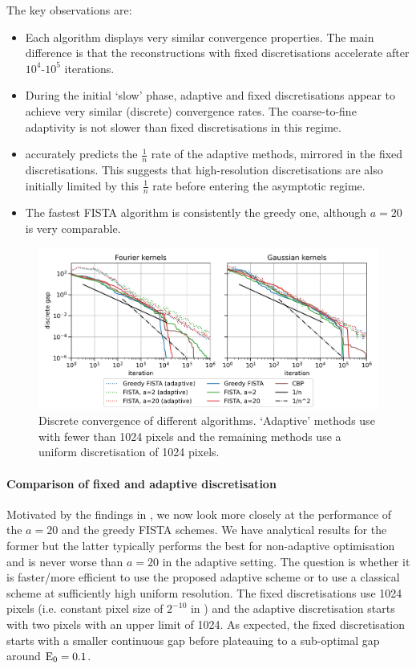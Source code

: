 \documentclass[10pt,a4paper,onecolumn]{article}
\numberwithin{equation}{section}
\newcommand{\op}[1]{\operatorname{#1}}\newcommand{\overtext}[2]{\stackrel{\text{#1}}{#2}}
\newcommand*{\Func}[1]{%
	\IfEqCase{#1}{%
		{0}{\op{E}}%
		{1}{\op{F}}%
		{2}{\op{G}}%
		{3}{\op{H}}%
	}[\op{F}#1]%
}
\begin{document}
The key observations are:
\begin{itemize}
	\item Each algorithm displays very similar convergence properties. The main difference is that the reconstructions with fixed discretisations accelerate after $10^4$-$10^5$ iterations.
	\item During the initial `slow' phase, adaptive and fixed discretisations appear to achieve very similar (discrete) convergence rates. The coarse-to-fine adaptivity is not slower than fixed discretisations in this regime.
	\item {} accurately predicts the $\frac1n$ rate of the adaptive methods, mirrored in the fixed discretisations. This suggests that high-resolution discretisations are also initially limited by this $\frac1n$ rate before entering the asymptotic regime.
	\item The fastest FISTA algorithm is consistently the greedy one, although $a=20$ is very comparable.
\end{itemize}

\begin{figure}[H]\centering
	\includegraphics[width=.84\textwidth]{lasso_convergence_short}
	\caption{Discrete convergence of different algorithms. `Adaptive' methods use  with fewer than 1024 pixels and the remaining methods use a uniform discretisation of 1024 pixels.}\label{fig: convergence with method}
\end{figure}

\paragraph{Comparison of fixed and adaptive discretisation}
Motivated by the findings in , we now look more closely at the performance of the $a=20$ and the greedy FISTA schemes. We have analytical results for the former but the latter typically performs the best for non-adaptive optimisation and is never worse than $a=20$ in the adaptive setting. The question is whether it is faster/more efficient to use the proposed adaptive scheme or to use a classical scheme at sufficiently high uniform resolution. The fixed discretisations use 1024 pixels (i.e. constant pixel size of $2^{-10}$ in ) and the adaptive discretisation starts with two pixels with an upper limit of 1024. As expected, the fixed discretisation starts with a smaller continuous gap before plateauing to a sub-optimal gap around $\Func0_0=0.1$.
\end{document}

